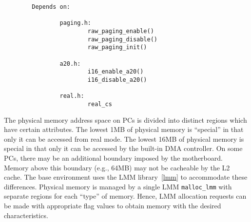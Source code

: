 {\begin{verbatim}
        Depends on:

                paging.h:
                        raw_paging_enable()
                        raw_paging_disable()
                        raw_paging_init()

                a20.h:
                        i16_enable_a20()
                        i16_disable_a20()

                real.h:
                        real_cs

\end{verbatim}

}%

\label{phys-lmm}
\label{kern-x86pc-base-phys}
\label{kern-x86pc-base-firstsection}

The physical memory address space on PCs is divided into distinct regions
which have certain attributes.
The lowest 1MB of physical memory is ``special''
in that only it can be accessed from real mode.
The lowest 16MB of physical memory is special
in that only it can be accessed by the built-in DMA controller.
On some PCs, there may be an additional boundary imposed by the motherboard.
Memory above this boundary (e.g., 64MB) may not be cacheable by the L2 cache.
The base environment uses the \oskit{} LMM library~\ref{lmm} to accommodate
these differences.
Physical memory is managed by a single LMM {\tt malloc_lmm} with separate
regions for each ``type'' of memory.
Hence, LMM allocation requests can be made with appropriate flag values to
obtain memory with the desired characteristics.

